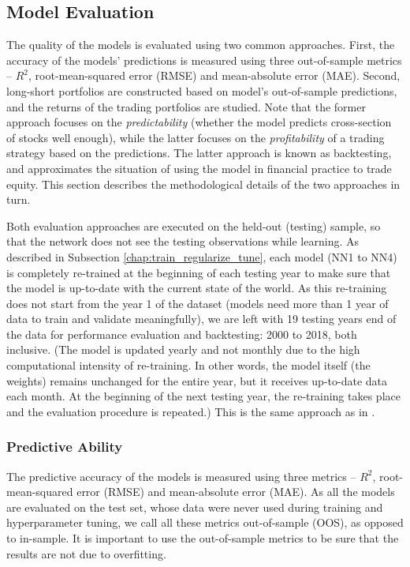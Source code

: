 	\subsection{Model Evaluation}
		\label{chap:model_evaluation}
		The quality of the models is evaluated using two common approaches. First, the accuracy of the models' predictions is measured using three out-of-sample metrics – $R^2$, root-mean-squared error (RMSE) and mean-absolute error (MAE). Second, long-short portfolios are constructed based on model's out-of-sample predictions, and the returns of the trading portfolios are studied. Note that the former approach focuses on the \textit{predictability} (whether the model predicts cross-section of stocks well enough), while the latter focuses on the \textit{profitability} of a trading strategy based on the predictions. The latter approach is known as backtesting, and approximates the situation of using the model in financial practice to trade equity. This section describes the methodological details of the two approaches in turn. 
		
		Both evaluation approaches are executed on the held-out (testing) sample, so that the network does not see the testing observations while learning. As described in Subsection \ref{chap:train_regularize_tune}, each model (NN1 to NN4) is completely re-trained at the beginning of each testing year to make sure that the model is up-to-date with the current state of the world. As this re-training does not start from the year 1 of the dataset (models need more than 1 year of data to train and validate meaningfully), we are left with 19 testing years end of the data for performance evaluation and backtesting: 2000 to 2018, both inclusive. (The model is updated yearly and not monthly due to the high computational intensity of re-training. In other words, the model itself (the weights) remains unchanged for the entire year, but it receives up-to-date data each month. At the beginning of the next testing year, the re-training takes place and the evaluation procedure is repeated.) This is the same approach as in \cite{gu2020empirical, tobek2020does}.
		
		\subsubsection{Predictive Ability} 
		
			The predictive accuracy of the models is measured using three metrics – $R^2$, root-mean-squared error (RMSE) and mean-absolute error (MAE). As all the models are evaluated on the test set, whose data were never used during training and hyperparameter tuning, we call all these metrics out-of-sample (OOS), as opposed to in-sample. It is important to use the out-of-sample metrics to be sure that the results are not due to overfitting. 
			
